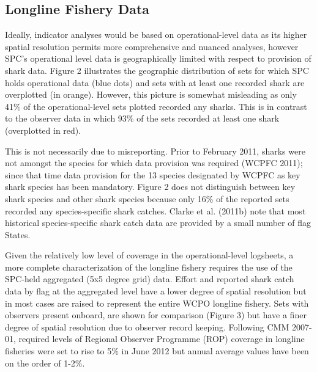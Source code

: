 \documentclass[12pt]{SCreport}
\begin{document}
\subsection{Longline Fishery Data}
  
  
Ideally, indicator analyses would be based on operational-level data as its higher spatial resolution permits more comprehensive and nuanced analyses, however SPC's operational level data is geographically limited with respect to provision of shark data.  Figure 2 illustrates the geographic distribution of sets for which SPC holds operational data (blue dots) and sets with at least one recorded shark are overplotted (in orange). However, this picture is somewhat misleading as only 41\% of the operational-level sets plotted recorded any sharks. This is in contrast to the observer data in which 93\% of the sets recorded at least one shark (overplotted in red).

This is not necessarily due to misreporting. Prior to February 2011, sharks were not amongst the species for which data provision was required (WCPFC 2011); since that time data provision for the 13 species designated by WCPFC as key shark species has been mandatory. Figure 2 does not distinguish between key shark species and other shark species because only 16\% of the reported sets recorded any species-specific shark catches. Clarke et al. (2011b) note that most historical species-specific shark catch data are provided by a small number of flag States.

Given the relatively low level of coverage in the operational-level logsheets, a more complete characterization of the longline fishery requires the use of the SPC-held aggregated (5x5 degree grid) data. Effort and reported shark catch data by flag at the aggregated level have a lower degree of spatial resolution but in most cases are raised to represent the entire WCPO longline fishery. Sets with observers present onboard, are shown for comparison (Figure 3) but have a finer degree of spatial resolution due to observer record keeping. Following CMM 2007-01, required levels of Regional Observer Programme (ROP) coverage in longline fisheries were set to rise to 5\% in June 2012 but annual average values have been on the order of 1-2\%.
\end{document}
